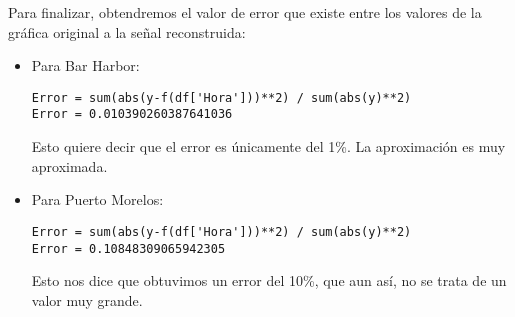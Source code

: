 \documentclass{article}
\begin{document}
Para finalizar, obtendremos el valor de error que existe entre los valores de la gráfica original a la señal reconstruida:\\
\begin{itemize}
\item Para Bar Harbor:
\begin{verbatim}
Error = sum(abs(y-f(df['Hora']))**2) / sum(abs(y)**2)
Error = 0.010390260387641036
\end{verbatim}
Esto quiere decir que el error es únicamente del 1\%. La aproximación es muy aproximada.\\

\item Para Puerto Morelos:
\begin{verbatim}
Error = sum(abs(y-f(df['Hora']))**2) / sum(abs(y)**2)
Error = 0.10848309065942305
\end{verbatim}
Esto nos dice que obtuvimos un error del 10\%, que aun así, no se trata de un valor muy grande.
\end{itemize}
\end{document}
